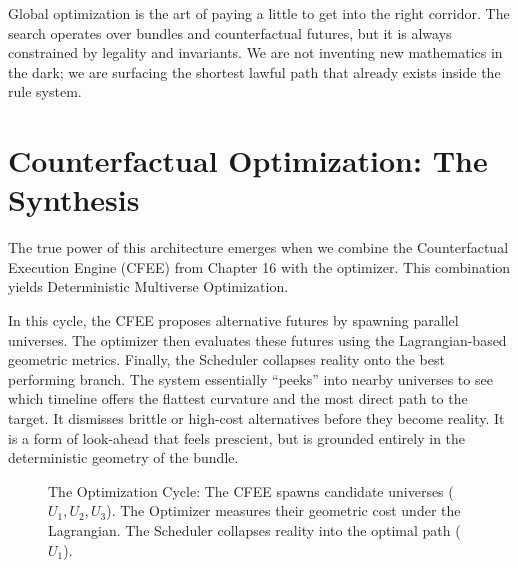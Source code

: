 Global optimization is the art of paying a little to get into the right corridor. The search operates over bundles and counterfactual futures, but it is always constrained by legality and invariants. We are not inventing new mathematics in the dark; we are surfacing the shortest lawful path that already exists inside the rule system.

\section{Counterfactual Optimization: The Synthesis}
\label{counterfactual-optimization-cfee-optimizer-magic}

The true power of this architecture emerges when we combine the Counterfactual Execution Engine (CFEE) from Chapter 16 with the optimizer. This combination yields Deterministic Multiverse Optimization.

In this cycle, the CFEE proposes alternative futures by spawning parallel universes. The optimizer then evaluates these futures using the Lagrangian-based geometric metrics. Finally, the Scheduler collapses reality onto the best performing branch. The system essentially ``peeks'' into nearby universes to see which timeline offers the flattest curvature and the most direct path to the target. It dismisses brittle or high-cost alternatives before they become reality. It is a form of look-ahead that feels prescient, but is grounded entirely in the deterministic geometry of the bundle.

\begin{figure}[h]
\centering
{}
\caption{The Optimization Cycle: The CFEE spawns candidate universes ($U_1, U_2, U_3$). The Optimizer measures their geometric cost under the Lagrangian. The Scheduler collapses reality into the optimal path ($U_1$).}
\end{figure}

